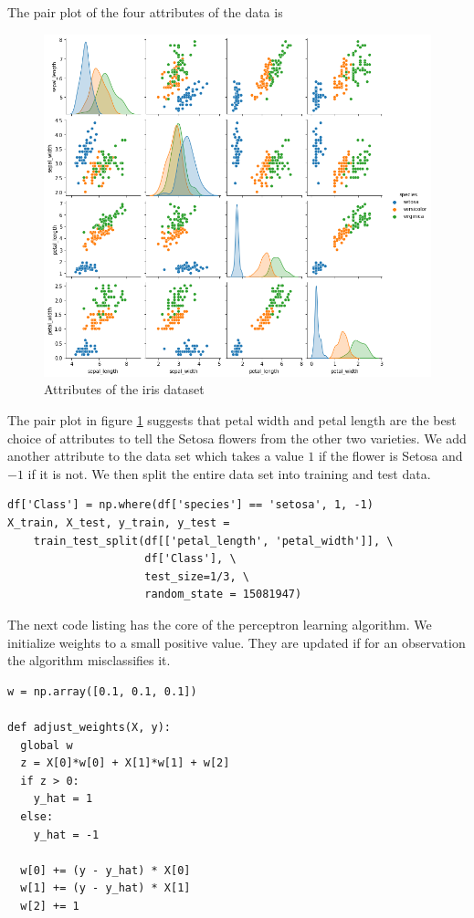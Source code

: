 \documentclass[11pt]{article}
\numberwithin{equation}{section}
\begin{document}
The pair plot of the four attributes of the data is
\begin{figure}[!ht]
\centering
\includegraphics[scale=0.4]{iris}
\caption{Attributes of the iris dataset}
\label{f2}
\end{figure}

The pair plot in figure \ref{f2} suggests that petal width and petal length
are the best choice of attributes to tell the Setosa flowers from the other
two varieties. We add another attribute to the data set which takes a value
$1$ if the flower is Setosa and $-1$ if it is not. We then split the entire
data set into training and test data.

\begin{verbatim}
df['Class'] = np.where(df['species'] == 'setosa', 1, -1)
X_train, X_test, y_train, y_test = 
	train_test_split(df[['petal_length', 'petal_width']], \
                     df['Class'], \
                     test_size=1/3, \
                     random_state = 15081947)
\end{verbatim}

The next code listing has the core of the perceptron learning algorithm. We 
initialize weights to a small positive value. They are updated if for an 
observation the algorithm misclassifies it.
\begin{verbatim}
w = np.array([0.1, 0.1, 0.1]) 

def adjust_weights(X, y):
  global w
  z = X[0]*w[0] + X[1]*w[1] + w[2]
  if z > 0:
    y_hat = 1
  else:
    y_hat = -1
    
  w[0] += (y - y_hat) * X[0]
  w[1] += (y - y_hat) * X[1]
  w[2] += 1
\end{verbatim}
\end{document}
